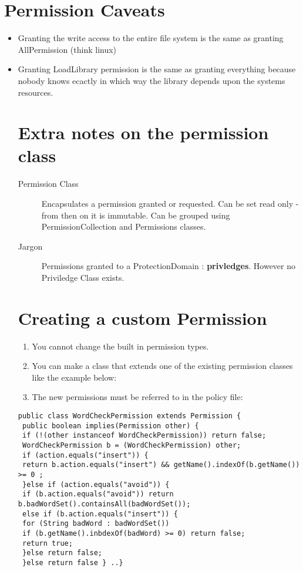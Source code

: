 \documentclass[a4paper,10pt]{scrreprt}
\begin{document}
\section{Permission Caveats}
\begin{itemize}
 \item Granting the write access to the entire file system is the same as granting AllPermission (think linux)
 \item Granting LoadLibrary permission is the same as granting everything because nobody knows ecactly in which way the 
library depends upon the systems resources. 

\section{Extra notes on the permission class}
\begin{description}
 \item [Permission Class] Encapsulates a permission granted or requested. Can be set read only - from then on it is 
immutable. Can be grouped using PermissionCollection and Permissions classes. 
\item [Jargon] Permissions granted to a ProtectionDomain : \textbf{privledges}. However no Priviledge Class exists. 
\end{description}

\section{Creating a custom Permission}
\begin{enumerate}
 \item You cannot change the built in permission types. 
 \item You can make a class that extends one of the existing permission classes like the example below:
 \item The new permissions must be referred to in the policy file:
\end{enumerate}
\begin{lstlisting}[caption=Custom Permission]
 public class WordCheckPermission extends Permission {
 public boolean implies(Permission other) {
 if (!(other instanceof WordCheckPermission)) return false;
 WordCheckPermission b = (WordCheckPermission) other;
 if (action.equals("insert")) {
 return b.action.equals("insert") && getName().indexOf(b.getName()) >= 0 ;
 }else if (action.equals("avoid")) {
 if (b.action.equals("avoid")) return b.badWordSet().containsAll(badWordSet());
 else if (b.action.equals("insert")) {
 for (String badWord : badWordSet())
 if (b.getName().inbdexOf(badWord) >= 0) return false;
 return true;
 }else return false;
 }else return false } ..}
 

\end{lstlisting}
\end{itemize}
\end{document}
